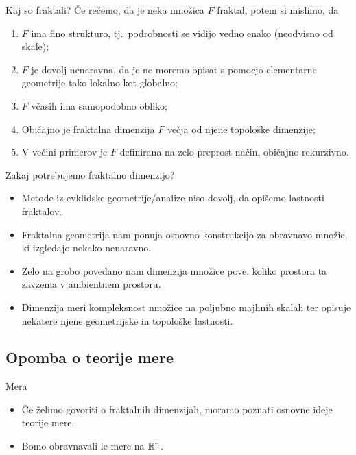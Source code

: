 \documentclass[10pt]{beamer}
\begin{document}
\begin{frame}{Kaj so fraktali?}
    Če rečemo, da je neka množica \(F\) fraktal, potem si mislimo, da
    \begin{enumerate}
        \item \(F\) ima fino strukturo, tj.\ podrobnosti se vidijo vedno enako (neodvisno od skale);
        \item \(F\) je dovolj nenaravna, da je ne moremo opisat s pomocjo elementarne geometrije tako lokalno kot globalno;
        \item \(F\) včasih ima samopodobno obliko;
        \item Običajno je fraktalna dimenzija \(F\) večja od njene topološke dimenzije;
        \item V večini primerov  je \(F\) definirana na zelo preprost način, običajno rekurzivno.
    \end{enumerate}   
\end{frame}

\begin{frame}{Zakaj potrebujemo fraktalno dimenzijo?}
    \begin{itemize}
        \item Metode iz evklidske geometrije/analize niso dovolj, da opišemo lastnosti fraktalov.
        \item Fraktalna geometrija nam ponuja osnovno konstrukcijo za obravnavo množic, ki izgledajo nekako nenaravno.
        \item Zelo na grobo povedano nam dimenzija množice pove, koliko prostora ta zavzema v ambientnem prostoru. 
        \item Dimenzija meri kompleksnost množice na poljubno majhnih skalah ter opisuje nekatere njene geometrijske in topološke lastnosti.
    \end{itemize}    
\end{frame}

\subsection{Opomba o teorije mere}
\begin{frame}{Mera}
    \begin{itemize}
        \item Če želimo govoriti o fraktalnih dimenzijah, moramo poznati osnovne ideje teorije mere.
        \item Bomo obravnavali le mere na \(\mathbb{R}^n\).
    \end{itemize}    
\end{frame}
\end{document}
